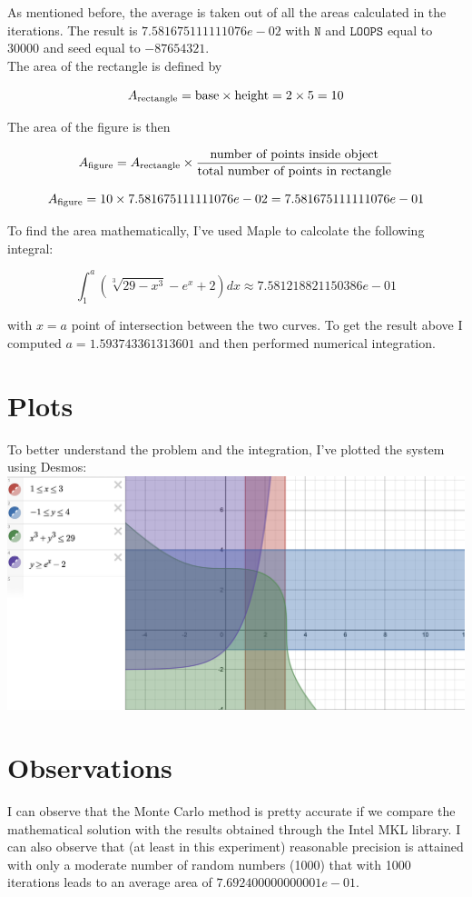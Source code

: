 \documentclass{article}
\newcommand{\code}{\texttt}
\begin{document}
As mentioned before, the average is taken out of all the areas calculated in the iterations. The result is $7.581675111111076e-02$ with $\code{N}$ and $\code{LOOPS}$ equal to 30000 and seed equal to $-87654321$.\\

The area of the rectangle is defined by 

$$A_{\textnormal{rectangle}}= \textnormal{base}\times \textnormal{height}=2\times5=10$$

The area of the figure is then

$$A_{\textnormal{figure}}=A_{\textnormal{rectangle}}\times \frac{\textnormal{number of points inside object}}{\textnormal{total number of points in rectangle}}$$

$$A_{\textnormal{figure}}=10\times 7.581675111111076e-02=7.581675111111076e-01$$

To find the area mathematically, I've used Maple to calcolate the following integral:

$$
\int_1^{a} (\sqrt[3]{29-x^3}-e^x+2)dx\approx 7.581218821150386e-01
$$

with $x=a$ point of intersection between the two curves. To get the result above I computed $a=1.593743361313601$ and then performed numerical integration.

\section{Plots}
To better understand the problem and the integration, I've plotted the system using Desmos:\\

\includegraphics[width=\textwidth,height=\textheight,keepaspectratio]{desmos.png}
\section{Observations}
I can observe that the Monte Carlo method is pretty accurate if we compare the mathematical solution with the results obtained through the Intel MKL library. I can also observe that (at least in this experiment) reasonable precision is attained with only a moderate number of random numbers (1000) that with 1000 iterations leads to an average area of $7.692400000000001e-01$.
\end{document}
